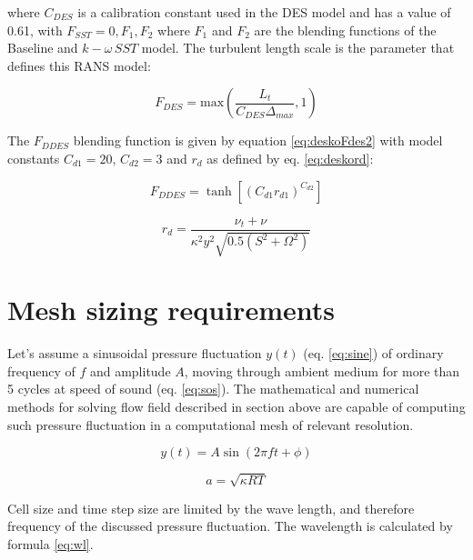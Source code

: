 \noindent where $C_{DES}$ is a calibration constant used in the DES model and has a value of 0.61, with $F_{SST} = 0, F_1, F_2$ where $F_1$ and $F_2$ are the blending functions of  the Baseline and $k-\omega \, SST$ model. The turbulent length scale is the parameter that defines this RANS model:

\begin{equation} \label{eq:deskoFdes2}
F_{DES} = \text{max}\left( \frac{L_t}{C_{DES} \Delta_{max}}, 1 \right)
\end{equation}

The $F_{DDES}$ blending function is given by equation \ref{eq:deskoFdes2} with model constants \mbox{$C_{d1} = 20$}, \mbox{$C_{d2} = 3$} and $r_d$ as defined by eq. \ref{eq:deskord}:

\begin{equation} \label{eq:deskoFddes}
F_{DDES} = \tanh \left[ \left( C_{d1} r_{d1} \right)^{C_{d2}} \right]
\end{equation}

\begin{equation} \label{eq:deskord}
r_d = \frac{\nu_t + \nu}{\kappa^2 y^2 \sqrt{0.5 \left( S^2 + \Omega^2 \right)}}
\end{equation}

\section{Mesh sizing requirements} \label{meshsize}
Let's assume a sinusoidal pressure fluctuation $y(t)$ (eq. \ref{eq:sine}) of ordinary frequency of $f$ and amplitude $A$, moving through ambient medium for more than 5 cycles at speed of sound (eq. \ref{eq:sos}). The mathematical and numerical methods for solving flow field described in section above are capable of computing such pressure fluctuation in a computational mesh of relevant resolution. 

\begin{equation} \label{eq:sine}
y(t) = A \sin(2 \pi f t + \phi)
\end{equation}

\begin{equation} \label{eq:sos}
a = \sqrt{\kappa R T}
\end{equation}

Cell size and time step size are limited by the wave length, and therefore frequency of the discussed pressure fluctuation. The wavelength is calculated by formula \ref{eq:wl}.

